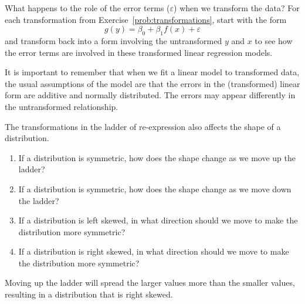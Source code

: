 \documentclass[twoside]{book}\usepackage[]{graphicx}\usepackage[]{xcolor}
\def\myindex#1{\index{#1}}
\begin{document}
\begin{problem}
  What happens to the role of the error terms ($\varepsilon$) when we transform 
  the data?  For each transformation from Exercise~\ref{prob:transformations},
  start with the form
  \[
  g(y) = \beta_0 + \beta_1 f(x) + \varepsilon
  \]
  and transform back into a form involving the untransformed $y$ and $x$ to
  see how the error terms are involved in these transformed linear regression
  models.

  It is important to remember that when we fit a linear model to transformed
  data, the usual assumptions of the model are that the errors in the (transformed) 
  linear form are additive and normally distributed.  The errors may appear
  differently in the untransformed relationship.
\end{problem}

\begin{problem}
\myindex{Tukey bulge|probidx}%
\label{prob:TukeyBulgeSkew}%
The transformations in the ladder of re-expression also affects the shape
of a distribution.  
\begin{enumerate}
\item
If a distribution is symmetric, how does the shape change as we 
move up the ladder?
\item
If a distribution is symmetric, how does the shape change as we 
move down the ladder?
\item
If a distribution is left skewed, in what direction should we move to 
make the distribution more symmetric?
\item
If a distribution is right skewed, in what direction should we move to 
make the distribution more symmetric?
\end{enumerate}
\end{problem}

\begin{solution}
Moving up the ladder will spread the larger values more than the 
smaller values, resulting in a distribution that is right skewed.
\end{solution}
\end{document}
